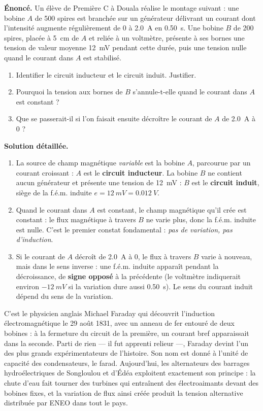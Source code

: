 \documentclass[11pt]{article}
\begin{document}
\begin{exoresolu}
\textbf{Énoncé.} Un élève de Première C à Douala réalise le montage suivant : une bobine $A$ de 500 spires est branchée sur un générateur délivrant un courant dont l'intensité augmente régulièrement de $0$ à \SI{2,0}{A} en \SI{0,50}{s}. Une bobine $B$ de 200 spires, placée à \SI{5}{cm} de $A$ et reliée à un voltmètre, présente à ses bornes une tension de valeur moyenne \SI{12}{mV} pendant cette durée, puis une tension nulle quand le courant dans $A$ est stabilisé.
\begin{enumerate}
\item Identifier le circuit inducteur et le circuit induit. Justifier.
\item Pourquoi la tension aux bornes de $B$ s'annule-t-elle quand le courant dans $A$ est constant ?
\item Que se passerait-il si l'on faisait ensuite décroître le courant de $A$ de \SI{2,0}{A} à $0$ ?
\end{enumerate}
\tcblower
\textbf{Solution détaillée.}
\begin{enumerate}
\item La source de champ magnétique \emph{variable} est la bobine $A$, parcourue par un courant croissant : $A$ est le \textbf{circuit inducteur}. La bobine $B$ ne contient aucun générateur et présente une tension de \SI{12}{mV} : $B$ est le \textbf{circuit induit}, siège de la f.é.m. induite $e = \SI{12}{mV} = \SI{0,012}{V}$.
\item Quand le courant dans $A$ est constant, le champ magnétique qu'il crée est constant : le flux magnétique à travers $B$ ne varie plus, donc la f.é.m. induite est nulle. C'est le premier constat fondamental : \emph{pas de variation, pas d'induction}.
\item Si le courant de $A$ décroît de \SI{2,0}{A} à $0$, le flux à travers $B$ varie à nouveau, mais dans le sens inverse : une f.é.m. induite apparaît pendant la décroissance, de \textbf{signe opposé} à la précédente (le voltmètre indiquerait environ $-\SI{12}{mV}$ si la variation dure aussi \SI{0,50}{s}). Le sens du courant induit dépend du sens de la variation.
\end{enumerate}
\end{exoresolu}

\begin{savaistu}
C'est le physicien anglais Michael Faraday qui découvrit l'induction électromagnétique le 29 août 1831, avec un anneau de fer entouré de deux bobines : à la fermeture du circuit de la première, un courant bref apparaissait dans la seconde. Parti de rien — il fut apprenti relieur —, Faraday devint l'un des plus grands expérimentateurs de l'histoire. Son nom est donné à l'unité de capacité des condensateurs, le farad. Aujourd'hui, les alternateurs des barrages hydroélectriques de Songloulou et d'Édéa exploitent exactement son principe : la chute d'eau fait tourner des turbines qui entraînent des électroaimants devant des bobines fixes, et la variation de flux ainsi créée produit la tension alternative distribuée par ENEO dans tout le pays.
\end{savaistu}
\end{document}
